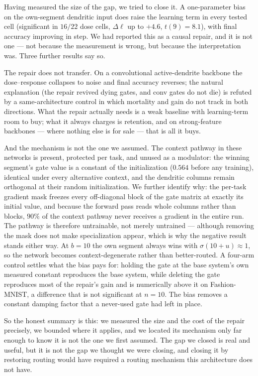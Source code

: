 \documentclass[review,12pt,number]{elsarticle}
\begin{document}
Having measured the size of the gap, we tried to close it. A one-parameter
bias on the own-segment dendritic input does raise the learning term in every
tested cell (significant in
$16/22$ dose cells, $\Delta\ell$ up to $+4.6$,
$t(9){=}8.1$), with final accuracy improving in step. We had reported this as
a causal repair, and it is not one --- not because the measurement is wrong,
but because the interpretation was. Three further results say so.

The repair does not transfer. On a convolutional active-dendrite backbone the
dose--response collapses to noise and final accuracy reverses; the natural
explanation (the repair revived dying gates, and conv gates do not die) is
refuted by a same-architecture control in which mortality and gain do not track
in both directions. What the repair actually needs is a weak baseline with
learning-term room to buy; what it always charges is retention, and on
strong-feature backbones --- where nothing else is for sale --- that is all it
buys.

And the mechanism is not the one we assumed. The context pathway in these
networks is present, protected per task, and unused as a modulator: the
winning segment's gate value is a constant of the initialization ($0.564$
before any training), identical under every alternative context, and the
dendritic columns remain orthogonal at their random initialization. We
further identify why: the per-task gradient mask freezes every
off-diagonal block of the gate matrix at exactly its initial value, and
because the forward pass reads whole columns rather than blocks, $90\%$
of the context pathway never receives a gradient in the entire run. The
pathway is therefore untrainable, not merely untrained --- although
removing the mask does not make specialization appear, which is why the
negative result stands either way. At $b{=}10$ the own segment always wins with
$\sigma(10+u)\approx 1$, so the network becomes context-degenerate rather
than better-routed. A four-arm control settles what the bias pays for:
holding the gate at the base system's own measured constant reproduces the
base system, while deleting the gate reproduces most of the repair's gain and
is numerically above it on Fashion-MNIST, a difference that is not significant at
$n{=}10$. The bias removes a constant
damping factor that a never-used gate had left in place.

So the honest summary is this: we measured the size and the cost of the
repair precisely, we bounded where it applies, and we located its mechanism
only far enough to know it is not the one we first assumed. The gap we
closed is real and useful, but it is not the gap we thought we were closing,
and closing it by restoring routing would have required a routing mechanism
this architecture does not have.
\end{document}
